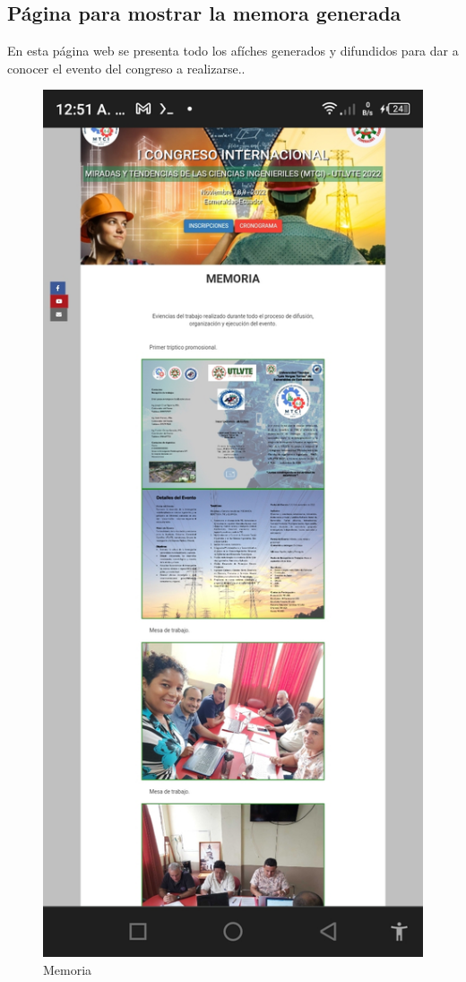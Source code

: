 \documentclass[a4paper,14px]{article}
\begin{document}
\newpage
\subsection{Página para mostrar la memora generada}
\label{sec:pagina-principal}

En esta página web se presenta todo los afíches generados y difundidos para dar a conocer el evento del congreso a realizarse..


\begin{figure}[H]
  \centering
  \includegraphics[scale=0.3]{memoria.jpg}
  \caption{Memoria}
  \label{fig:arquitectura}
\end{figure}
\end{document}
